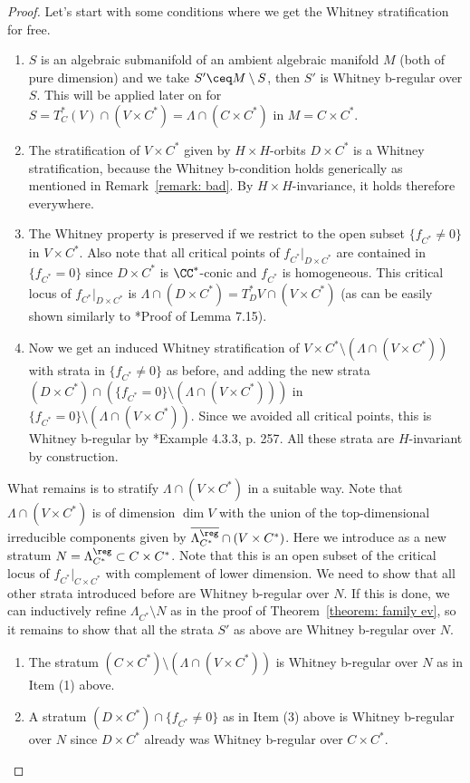 \documentclass[11pt,letterpaper]{amsart}
\numberwithin{equation}{section}
\begin{document}
\begin{proof}
    Let's start with some conditions where we get the Whitney stratification for free.
\begin{enumerate}
    \item 
    $S$ is an algebraic submanifold of an ambient algebraic manifold $M$ (both of pure dimension) and we take $S' \ceq M\setminus S$, then $S'$ is Whitney b-regular over $S$. This will be applied later on for $S= T^*_{C}(V) \cap (V\times C^*) = \Lambda\cap (C\times C^*)$ in $M = C\times C^*$.
    \item The stratification of $V\times C^*$ given by $H\times H$-orbits $D\times C^*$ is a Whitney stratification, because the Whitney b-condition holds generically as mentioned in Remark~\ref{remark: bad}. By $H\times H$-invariance, it holds therefore everywhere.
    \item The Whitney property is preserved if we restrict to the open subset $\{ f_{C^*} \neq 0\}$ in $V\times C^*$. Also note that all critical points of $f_{C^*}\vert_{D\times C^*}$ are contained in $\{ f_{C^*} = 0\}$ since $D\times C^*$ is $\CC^*$-conic and $f_{C^*}$ is homogeneous.
    This critical locus of $f_{C^*}\vert_{D\times C^*}$ is $\Lambda \cap (D\times C^*) = T^*_DV \cap (V\times C^*)$
    (as can be easily shown similarly to \cite{CFMMX22}*{Proof of Lemma 7.15}).
\item    Now we get an induced Whitney stratification of $V\times C^*\setminus (\Lambda\cap (V\times C^*))$ with strata in $\{ f_{C^*} \neq 0\}$ as before, and adding the new strata $(D\times C^* )\cap \left(\{ f_{C^*} = 0 \} \setminus (\Lambda\cap (V\times C^*))\right)$ in $\{ f_{C^*} = 0 \} \setminus (\Lambda\cap (V\times C^*))$. Since we avoided all critical points, this is Whitney b-regular by \cite{Sch03}*{Example 4.3.3, p. 257}. All these strata are $H$-invariant by construction.
\end{enumerate}
What remains is to stratify $\Lambda \cap (V\times C^*)$ in a suitable way.
Note that $\Lambda \cap (V\times C^*) $ is of dimension $\dim V$ with the union of the top-dimensional irreducible components given by $\overline{\Lambda^\reg_{C^*}} \cap (V\times C^*)$.
Here we introduce as a new stratum $N= \Lambda^\reg_{C^*}\subset C\times C^*$.
Note that this is an open subset of the critical locus of $f_{C^*}\vert_{C\times C^*}$ with complement of lower dimension. 
We need to show that all other strata introduced before are Whitney b-regular over $N$.
If this is done, we can inductively refine $\Lambda_{C^*} \setminus N$ as in the proof of Theorem~\ref{theorem: family ev}, so it remains to show that all the strata $S'$ as above are Whitney b-regular over $N$. 
\begin{enumerate}
    \item 
    The stratum $(C\times C^*)\setminus (\Lambda\cap (V\times C^*))$ is Whitney b-regular over $N$ as in Item (1) above.
    \item 
    A stratum $(D\times C^*) \cap \{f_{C^*} \neq 0 \}$ as in Item (3) above is Whitney b-regular over $N$ since $D\times C^*$
    already was Whitney b-regular over $C\times C^*$.
\end{enumerate}
 

\end{proof}
\end{document}
